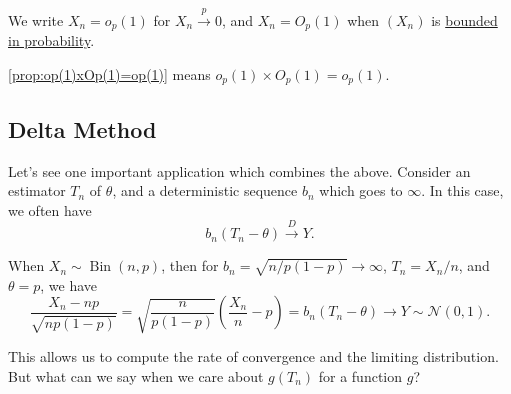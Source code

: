\begin{notation}
	We write \(X_n = o_p(1)\) for \(X_n \overset{p}{\to } 0\), and \(X_n = O_p(1)\) when \((X_n)\) is \hyperref[def:bounded-in-probability]{bounded in probability}.
\end{notation}

\begin{remark}
	\autoref{prop:op(1)xOp(1)=op(1)} means \(o_p(1) \times O_p(1) = o_p(1)\).
\end{remark}

\subsection{Delta Method}
Let's see one important application which combines the above. Consider an estimator \(T_n\) of \(\theta \), and a deterministic sequence \(b_n\) which goes to \(\infty \). In this case, we often have
\[
	b_n (T_n - \theta ) \overset{D}{\to } Y.
\]

\begin{eg}
	When \(X_n \sim \operatorname{Bin}(n, p) \), then for \(b_n = \sqrt{n / p (1 - p)} \to \infty \), \(T_n = X_n / n\), and \(\theta = p\), we have
	\[
		\frac{X_n - n p}{\sqrt{n p (1 - p)} }
		= \sqrt{\frac{n}{p (1 - p)}} \left( \frac{X_n}{n} - p \right)
		= b_n (T_n - \theta )
		\to Y \sim \mathcal{N} (0, 1).
	\]
\end{eg}

This allows us to compute the rate of convergence and the limiting distribution. But what can we say when we care about \(g(T_n)\) for a function \(g\)?

